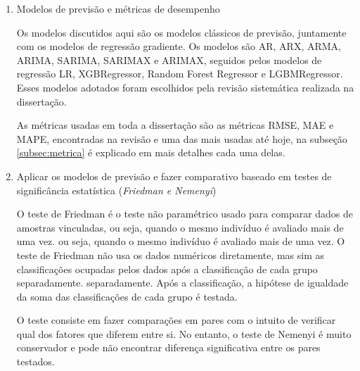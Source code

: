\begin{enumerate}[start=1, label = {\textbf{Etapa} \arabic* } ]
    	
    	\item Modelos de previsão e métricas de desempenho \label{etp:7}
    	
    	Os modelos discutidos aqui são os modelos clássicos de previsão, juntamente com os modelos de regressão gradiente. Os modelos são AR, ARX, ARMA, ARIMA, SARIMA, SARIMAX e ARIMAX, seguidos pelos modelos de regressão LR, XGBRegressor, Random Forest Regressor e LGBMRegressor. Esses modelos adotados foram escolhidos pela revisão sistemática realizada na dissertação.
    	
    	As métricas usadas em toda a dissertação são as métricas RMSE, MAE e MAPE, encontradas na revisão e uma das mais usadas até hoje, na subseção \ref{subsec:metrica} é explicado em mais detalhes cada uma delas.
    	
    	
    	
    	
    	
    	\item Aplicar os modelos de previsão e fazer comparativo baseado em testes de significância estatística (\textit{Friedman e Nemenyi}) \label{etp:9}
    	
    	
    	O teste de Friedman é o teste não paramétrico usado para comparar dados de amostras vinculadas, ou seja, quando o mesmo indivíduo é avaliado mais de uma vez. 
    	ou seja, quando o mesmo indivíduo é avaliado mais de uma vez. 
    	O teste de Friedman não usa os dados numéricos diretamente, mas sim as classificações ocupadas pelos dados após a classificação de cada grupo separadamente. 
    	separadamente. Após a classificação, a hipótese de igualdade da soma das classificações de cada grupo é testada. 

		O teste consiste em fazer comparações em pares com o intuito de verificar qual dos fatores que diferem entre si. No entanto, o teste de Nemenyi é muito conservador e pode não encontrar diferença significativa entre os pares testados.
    	
    \end{enumerate}






    